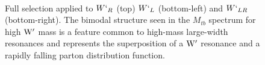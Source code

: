 \begin{figure}[htcb]
\begin{center}
\\
\caption{
Full selection applied to $W`_{R}$ (top) $W`_{L}$ (bottom-left) and $W`_{LR}$ (bottom-right).  The bimodal structure seen in the $M_{tb}$ spectrum for high $\mathrm{W}^\prime$ mass is a feature common to high-mass large-width resonances and represents the superposition of a $\mathrm{W}^\prime$ resonance and a rapidly falling parton distribution function. 
}
\label{figs:GCFS}
\end{center}
\end{figure}


\clearpage
